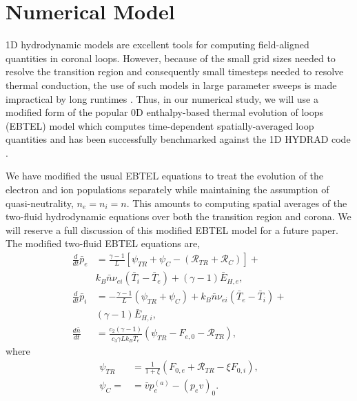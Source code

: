 \documentclass[iop]{emulateapj}
\begin{document}
	\section{Numerical Model}
	\par 1D hydrodynamic models are excellent tools for computing field-aligned quantities in coronal loops. However, because of the small grid sizes needed to resolve the transition region and consequently small timesteps needed to resolve thermal conduction, the use of such models in large parameter sweeps is made impractical by long runtimes \citep{bradshaw_influence_2013}. Thus, in our numerical study, we will use a modified form of the popular 0D enthalpy-based thermal evolution of loops (EBTEL) model \citep{klimchuk_highly_2008,cargill_enthalpy-based_2012,cargill_enthalpy-based_2012-1,cargill_modelling_2015} which computes time-dependent spatially-averaged loop quantities and has been successfully benchmarked against the 1D HYDRAD code \citep{bradshaw_influence_2013}.
	\par We have modified the usual EBTEL equations \citep[see][]{cargill_enthalpy-based_2012} to treat the evolution of the electron and ion populations separately while maintaining the assumption of quasi-neutrality, $n_e=n_i=n$. This amounts to computing spatial averages of the two-fluid hydrodynamic equations over both the transition region and corona. We will reserve a full discussion of this modified EBTEL model for a future paper. The modified two-fluid EBTEL equations are,
	\begin{align}
		\frac{d}{dt}\bar{p}_e &= \frac{\gamma - 1}{L}[\psi_{TR} + \psi_C -(\mathcal{R}_{TR} + \mathcal{R}_C)] + \nonumber \\ \quad&k_B\bar{n}\nu_{ei}(\bar{T}_i-\bar{T}_e) + (\gamma-1)\bar{E}_{H,e},\label{eq:press_e} \\[0.5em]
		\frac{d}{dt}\bar{p}_i &= -\frac{\gamma - 1}{L}(\psi_{TR} + \psi_C) + k_B\bar{n}\nu_{ei}(\bar{T}_e-\bar{T}_i) + \nonumber \\ \quad&(\gamma-1)\bar{E}_{H,i},\label{eq:press_i} \\[0.5em]
		\frac{d \bar{n}}{dt} &= \frac{c_2(\gamma-1)}{c_3\gamma Lk_B\bar{T}_e}(\psi_{TR} - F_{e,0}-\mathcal{R}_{TR}), 	\label{eq:density}
	\end{align}
	where 
	\begin{align}
		\psi_{TR} &= \frac{1}{1 + \xi}(F_{0,e} + \mathcal{R}_{TR} - \xi F_{0,i}), \label{eq:psi_tr}\\[0.5em]
		\psi_C = &= \bar{v}p_e^{(a)} - (p_ev)_0. \label{eq:psi_C}
	\end{align}
\end{document}
